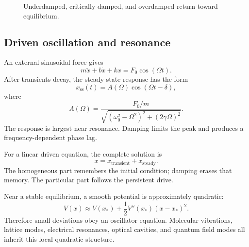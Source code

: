\begin{figure}[htbp]
\centering

\caption{Underdamped, critically damped, and overdamped return toward equilibrium.}
\label{fig:ch4-damping-regimes}
\end{figure}

\subsection{Driven oscillation and resonance}
An external sinusoidal force gives
\[
m\ddot x+b\dot x+kx=F_0\cos(\Omega t).
\]
After transients decay, the steady-state response has the form
\[
x_{\mathrm{ss}}(t)=A(\Omega)\cos(\Omega t-\delta),
\]
where
\[
A(\Omega)=\frac{F_0/m}{\sqrt{(\omega_0^2-\Omega^2)^2+(2\gamma\Omega)^2}}.
\]
The response is largest near resonance. Damping limits the peak and produces a frequency-dependent phase lag.

\begin{keyidea}
For a linear driven equation, the complete solution is
\[
x=x_{\mathrm{transient}}+x_{\mathrm{steady}}.
\]
The homogeneous part remembers the initial condition; damping erases that memory. The particular part follows the persistent drive.
\end{keyidea}

\begin{physicalbox}
Near a stable equilibrium, a smooth potential is approximately quadratic:
\[
V(x)\approx V(x_*)+\frac12V''(x_*)(x-x_*)^2.
\]
Therefore small deviations obey an oscillator equation. Molecular vibrations, lattice modes, electrical resonances, optical cavities, and quantum field modes all inherit this local quadratic structure.
\end{physicalbox}
